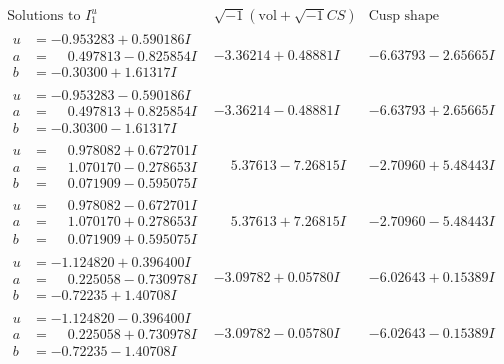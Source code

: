 \documentclass[1p]{elsarticle_modified}
\theoremstyle{definition}
\newcommand{\I}{\sqrt{-1}}
\begin{document}
$$\begin{array}{c|c|c}  
\text{Solutions to }I^u_{1}& \I (\text{vol} + \sqrt{-1}CS) & \text{Cusp shape}\\
 \hline 
\begin{aligned}
u &= -0.953283 + 0.590186 I \\
a &= \phantom{-}0.497813 - 0.825854 I \\
b &= -0.30300 + 1.61317 I\end{aligned}
 & -3.36214 + 0.48881 I & -6.63793 - 2.65665 I \\ \hline\begin{aligned}
u &= -0.953283 - 0.590186 I \\
a &= \phantom{-}0.497813 + 0.825854 I \\
b &= -0.30300 - 1.61317 I\end{aligned}
 & -3.36214 - 0.48881 I & -6.63793 + 2.65665 I \\ \hline\begin{aligned}
u &= \phantom{-}0.978082 + 0.672701 I \\
a &= \phantom{-}1.070170 - 0.278653 I \\
b &= \phantom{-}0.071909 - 0.595075 I\end{aligned}
 & \phantom{-}5.37613 - 7.26815 I & -2.70960 + 5.48443 I \\ \hline\begin{aligned}
u &= \phantom{-}0.978082 - 0.672701 I \\
a &= \phantom{-}1.070170 + 0.278653 I \\
b &= \phantom{-}0.071909 + 0.595075 I\end{aligned}
 & \phantom{-}5.37613 + 7.26815 I & -2.70960 - 5.48443 I \\ \hline\begin{aligned}
u &= -1.124820 + 0.396400 I \\
a &= \phantom{-}0.225058 - 0.730978 I \\
b &= -0.72235 + 1.40708 I\end{aligned}
 & -3.09782 + 0.05780 I & -6.02643 + 0.15389 I \\ \hline\begin{aligned}
u &= -1.124820 - 0.396400 I \\
a &= \phantom{-}0.225058 + 0.730978 I \\
b &= -0.72235 - 1.40708 I\end{aligned}
 & -3.09782 - 0.05780 I & -6.02643 - 0.15389 I \\ \hline\begin{aligned}

\end{aligned}
\end{array}$$
\end{document}
